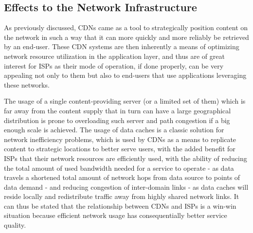 \subsection{Effects to the Network Infrastructure}

    As previously discussed, CDNs came as a tool to strategically position content on the network in such a way that it can more quickly and more reliably be retrieved by an end-user.
    These CDN systems are then inherently a means of optimizing network resource utilization in the application layer, and thus are of great interest for ISPs as their mode of operation, if done properly, can be very appealing not only to them but also to end-users that use applications leveraging these networks.

    The usage of a single content-providing server (or a limited set of them) which is far away from the content supply that in turn can have a large geographical distribution is prone to overloading such server and path congestion if a big enough scale is achieved.
    The usage of data caches is a classic solution for network inefficiency problems, which is used by CDNs as a means to replicate content to strategic locations to better serve users, with the added benefit for ISPs that their network resources are efficiently used, with the ability of reducing the total amount of used bandwidth needed for a service to operate - as data travels a shortened total amount of network hops from data source to points of data demand - and reducing congestion of inter-domain links - as data caches will reside locally and redistribute traffic away from highly shared network links.
    It can thus be stated that the relationship between CDNs and ISPs is a win-win situation because efficient network usage has consequentially better service quality.

